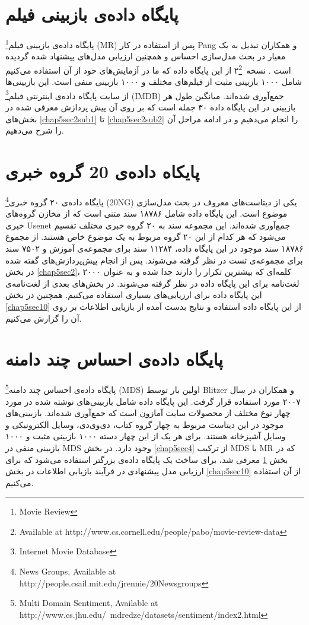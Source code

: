 \section{پایگاه داده‌ی بازبینی فیلم}
\label{chap5sec3}
پایگاه داد‌ه‌ی بازبینی فیلم\footnote{Movie Review}
(MR)
 پس از استفاده در کار
Pang
و همکاران
\cite{pang2002thumbs}
تبدیل به یک معیار در بحث مدل‌سازی احساس و همچنین ارزیابی مدل‌های پیشنهاد شده گردیده است
\cite{lin2012weakly}.
نسخه~۲\footnote{Available at http://www.cs.cornell.edu/people/pabo/movie-review-data}
از این پایگاه داده که ما در آزمایش‌های خود از آن استفاده می‌‌کنیم شامل ۱۰۰۰ بازبینی مثبت از فیلم‌های مختلف و ۱۰۰۰ بازبینی منفی‌ است. این بازبینی‌ها از سایت پایگاه داد‌ه‌ی اینترنتی فیلم\footnote{Internet Movie Database}
(IMDB)
جمع‌آوری شده‌اند. میانگین طول هر بازبینی در این پایگاه داده ۳۰ جمله است که بر روی آن پیش پردازش معرفی شده در بخش‌های
\ref{chap5sec2sub1}
تا 
\ref{chap5sec2sub2}
 را انجام می‌دهیم  و در ادامه مراحل آن را شرح می‌دهیم.
 
 
 \section{پایکاه داده‌ی 20 گروه خبری}
 \label{chap5sec11}
 پایگاه داده‌ی ۲۰ گروه خبری\footnote{News Groups, Available at http://people.csail.mit.edu/jrennie/20Newsgroups}
(20NG)
 یکی‌ از دیتاست‌های معروف در بحث مدل‌سازی موضوع است. این پایگاه داده شامل ۱۸۷۸۶ سند متنی است که از مخازن گروه‌های خبری
 Usenet
 جمع‌آوری شده‌اند. این مجموعه سند به ۲۰ گروه خبری مختلف تقسیم می‌‌شود که هر کدام از این ۲۰ گروه مربوط به یک موضوع خاص هستند. از مجموع ۱۸۷۸۶ سند موجود در این پایگاه داده، ۱۱۲۸۴ سند برای مجموعه‌ی آموزش و ۷۵۰۲ سند برای مجموعه‌ی تست در نظر گرفته می‌‌شوند. پس از انجام پیش‌پردازش‌های گفته‌ شده در بخش
 \ref{chap5sec2}،
 ۲۰۰۰ کلمه‌ای‌ که بیشترین تکرار را دارند جدا شده و به عنوان لغت‌نامه برای این پایگاه داده در نظر گرفته می‌‌شوند. در بخش‌های بعدی از لغت‌نامه‌ی این پایگاه داده برای ارزیابی‌های بسیاری استفاده می‌کنیم. همچنین در بخش 
 \ref{chap5sec10}
 از این پایگاه داده استفاده و نتایج بدست آمده از بازیایی اطلاعات بر روی آن را گزارش می‌کنیم.
 
 \section{پایگاه داده‌ی احساس چند دامنه}
 \label{chap5sec12}
 پایگاه داده‌‌ی احساس چند دامنه\footnote{Multi Domain Sentiment, Available at http://www.cs.jhu.edu/~mdredze/datasets/sentiment/index2.html}
 (MDS)
 اولین بار توسط
 Blitzer
 و همکاران
 \cite{blitzer2007biographies}
 در سال ۲۰۰۷ مورد استفاده قرار گرفت. این پایگاه داده شامل بازبینی‌های نوشته شده در مورد چهار نوع مختلف از محصولات سایت آمازون است که جمع‌آوری شده‌اند.  بازبینی‌های موجود در این دیتاست مربوط به چهار گروه کتاب، دی‌وی‌دی، وسایل الکترونیکی‌ و وسایل آشپزخانه هستند. برای هر یک از این چهار دسته ۱۰۰۰ بازبینی مثبت و ۱۰۰۰ بازبینی منفی‌ در
 MDS
 وجود دارد. در بخش
 \ref{chap5sec4}
 از ترکیب
 MDS
 با
 MR
 که در بخش
 \ref{chap5sec3}
 معرفی‌ شد، برای ساخت یک پایگاه داده‌ی بزرگتر استفاده می‌‌شود که برای ارزیابی مدل پیشنهادی در فرآیند بازیابی اطلاعات در بخش
 \ref{chap5sec10}
 از آن استفاده می‌‌کنیم.

